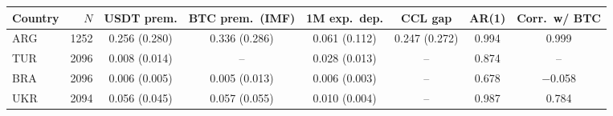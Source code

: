 \begin{tabular}{lrcccccc}
\toprule
Country & $N$ & USDT prem. & BTC prem.\ (IMF) & 1M exp.\ dep. & CCL gap & AR(1) & Corr.\ w/ BTC
\\ \midrule
ARG & 1252 & 0.256 (0.280) & 0.336 (0.286) & 0.061 (0.112) & 0.247 (0.272) & 0.994 & 0.999 \\
TUR & 2096 & 0.008 (0.014) & -- & 0.028 (0.013) & -- & 0.874 & -- \\
BRA & 2096 & 0.006 (0.005) & 0.005 (0.013) & 0.006 (0.003) & -- & 0.678 & $-$0.058 \\
UKR & 2094 & 0.056 (0.045) & 0.057 (0.055) & 0.010 (0.004) & -- & 0.987 & 0.784 \\
\bottomrule
\end{tabular}
